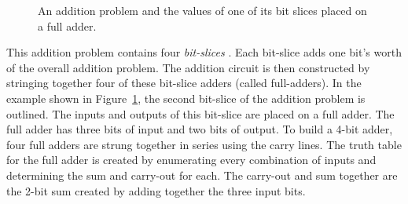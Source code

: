     \begin{figure}[ht]
        \caption{An addition problem and the values of one of its
        bit slices placed on a full adder.}
        \label{fig:comboBBadd}
    \end{figure}

    This addition problem contains four \textit{ bit-slices} .
    Each bit-slice adds one bit's worth of the overall addition problem.
    The addition circuit is then constructed by stringing together four
    of these bit-slice adders (called full-adders).  In the example shown
    in Figure~\ref{fig:comboBBadd}, the second bit-slice of the addition problem
    is outlined.  The inputs and outputs of this bit-slice are placed on
    a full adder.  The full adder has three bits of input and two bits of output.
    To build a 4-bit adder, four full adders are strung together in series
    using the carry lines.  The truth table for the full adder is created
    by enumerating every combination of inputs and determining the sum and
    carry-out for each.  The carry-out and sum together are the 2-bit sum
    created by adding together the three input bits.

